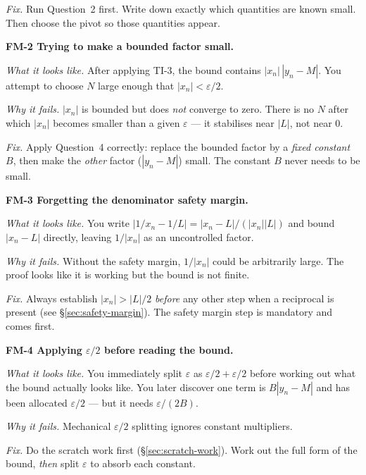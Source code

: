 \textit{Fix.} Run Question~2 first.
Write down exactly which quantities are known small.
Then choose the pivot so those quantities appear.

\bigskip

\noindent\textbf{FM-2 \quad Trying to make a bounded factor small.}

\textit{What it looks like.}
After applying TI-3, the bound contains $|x_n|\,|y_n - M|$.
You attempt to choose $N$ large enough that $|x_n| < \varepsilon/2$.

\textit{Why it fails.}
$|x_n|$ is bounded but does \emph{not} converge to zero.
There is no $N$ after which $|x_n|$ becomes smaller than a given
$\varepsilon$ --- it stabilises near $|L|$, not near $0$.

\textit{Fix.} Apply Question~4 correctly: replace the bounded factor
by a \emph{fixed constant} $B$, then make the \emph{other} factor
($|y_n - M|$) small. The constant $B$ never needs to be small.

\bigskip

\noindent\textbf{FM-3 \quad Forgetting the denominator safety margin.}

\textit{What it looks like.}
You write $|1/x_n - 1/L| = |x_n - L|/(|x_n||L|)$
and bound $|x_n - L|$ directly, leaving $1/|x_n|$ as an
uncontrolled factor.

\textit{Why it fails.}
Without the safety margin, $1/|x_n|$ could be arbitrarily large.
The proof looks like it is working but the bound is not finite.

\textit{Fix.} Always establish $|x_n| > |L|/2$ \emph{before} any
other step when a reciprocal is present (see \S\ref{sec:safety-margin}).
The safety margin step is mandatory and comes first.

\bigskip

\noindent\textbf{FM-4 \quad Applying $\varepsilon/2$ before reading the bound.}

\textit{What it looks like.}
You immediately split $\varepsilon$ as $\varepsilon/2 + \varepsilon/2$
before working out what the bound actually looks like.
You later discover one term is $B|y_n - M|$ and has been allocated
$\varepsilon/2$ --- but it needs $\varepsilon/(2B)$.

\textit{Why it fails.}
Mechanical $\varepsilon/2$ splitting ignores constant multipliers.

\textit{Fix.} Do the scratch work first (\S\ref{sec:scratch-work}).
Work out the full form of the bound, \emph{then} split $\varepsilon$
to absorb each constant.

